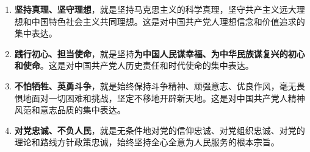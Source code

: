 \documentclass[10pt, UTF8]{ctexbook} %
\begin{document}
\begin{mdframed}[frametitle={伟大建党精神：中国共产党的精神之源}]
    \begin{enumerate}[itemsep=0pt]
        \item \textbf{坚持真理、坚守理想}，就是坚持马克思主义的科学真理，坚守共产主义远大理想和中国特色社会主义共同理想。这是对中国共产党人理想信念和价值追求的集中表达。
        \item \textbf{践行初心、担当使命}，就是坚持\textbf{为中国人民谋幸福、为中华民族谋复兴的初心和使命}。这是对中国共产党人历史责任和时代使命的集中表达。
        \item \textbf{不怕牺牲、英勇斗争}，就是始终保持斗争精神、顽强意志、优良作风，毫无畏惧地面对一切困难和挑战，坚定不移地开辟新天地。这是对中国共产党人精神风范和意志品质的集中表达。
        \item \textbf{对党忠诚、不负人民}，就是无条件地对党的信仰忠诚、对党组织忠诚、对党的理论和路线方针政策忠诚，始终坚持全心全意为人民服务的根本宗旨。
    \end{enumerate}
\end{mdframed}







\end{document}
